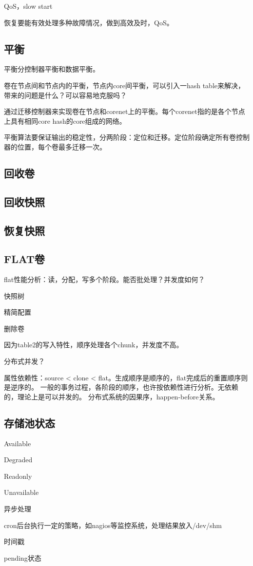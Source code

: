 QoS，slow start

恢复要能有效处理多种故障情况，做到高效及时，QoS。

\subsection{平衡}

平衡分控制器平衡和数据平衡。

卷在节点间和节点内的平衡，节点内core间平衡，可以引入一hash table来解决，
带来的问题是什么？可以容易地克服吗？

通过迁移控制器来实现卷在节点和corenet上的平衡。每个corenet指的是各个节点上具有相同core hash的core组成的网络。

平衡算法要保证输出的稳定性，分两阶段：定位和迁移。定位阶段确定所有卷控制器的位置，每个卷最多迁移一次。

\subsection{回收卷}

\subsection{回收快照}

\subsection{恢复快照}

\subsection{FLAT卷}

flat性能分析：读，分配，写多个阶段。能否批处理？并发度如何？

快照树

精简配置

删除卷

因为table2的写入特性，顺序处理各个chunk，并发度不高。

分布式并发？

属性依赖性：source < clone < flat。生成顺序是顺序的，flat完成后的重置顺序则是逆序的。
一般的事务过程，各阶段的顺序，也许按依赖性进行分析。无依赖的，理论上是可以并发的。
分布式系统的因果序，happen-before关系。

\subsection{存储池状态}

\begin{compactitem}
\item Available
\item Degraded
\item Readonly
\item Unavailable
\end{compactitem}

异步处理

cron后台执行一定的策略，如nagios等监控系统，处理结果放入/dev/shm

时间戳

pending状态
